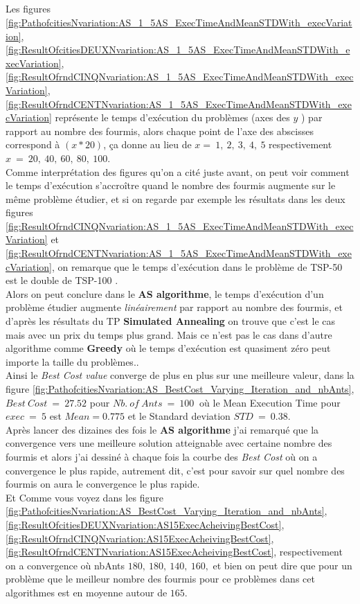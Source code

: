 \subsection*{}

Les figures 
\ref{fig:PathofcitiesNvariation:AS_1_5AS_ExecTimeAndMeanSTDWith_execVariation}, 
\ref{fig:ResultOfcitiesDEUXNvariation:AS_1_5AS_ExecTimeAndMeanSTDWith_execVariation}, 
\ref{fig:ResultOfrndCINQNvariation:AS_1_5AS_ExecTimeAndMeanSTDWith_execVariation}, 
\ref{fig:ResultOfrndCENTNvariation:AS_1_5AS_ExecTimeAndMeanSTDWith_execVariation} représente le temps d'exécution du problèmes (axes des $ y $ ) par rapport au nombre des fourmis, alors chaque point de l'axe des abscisses correspond à $ (x*20 )  $, ça donne au lieu de $ x=\ 1,\ 2,\ 3,\ 4,\ 5 $ respectivement $ x\ =\ 20,\ 40,\ 60,\ 80,\ 100 $.\\
Comme interprétation des figures qu'on a cité juste avant, on peut voir comment le temps d'exécution s'accroître quand le nombre des fourmis augmente sur le même problème étudier, et si on regarde par exemple les résultats dans les deux figures \ref{fig:ResultOfrndCINQNvariation:AS_1_5AS_ExecTimeAndMeanSTDWith_execVariation} et 
\ref{fig:ResultOfrndCENTNvariation:AS_1_5AS_ExecTimeAndMeanSTDWith_execVariation}, on remarque que le temps d'exécution dans le problème de TSP-50 est le double de TSP-100 .\\
Alors on peut conclure dans le \textbf{AS algorithme}, le temps d'exécution d'un problème étudier augmente \textit{linéairement} par rapport au nombre des fourmis, et d'après les résultats du TP \textbf{Simulated Annealing} on trouve que c'est le cas mais avec un prix du temps plus grand. Mais ce n'est pas le cas dans d'autre algorithme comme \textbf{Greedy} où le temps d'exécution est quasiment zéro peut importe la taille du problèmes..\\
Ainsi le \textit{Best Cost value} converge de plus en plus sur  une meilleure valeur, \eg dans la figure \ref{fig:PathofcitiesNvariation:AS_BestCost_Varying_Iteration_and_nbAnts}, $ Best\ Cost\ =\ 27.52 $ pour $ Nb.\ of\ Ants\ =\ 100\ $ o\`u 
le Mean Execution Time pour $ exec\ =\ 5 $  est $Mean=0.775 $ et le Standard deviation $ STD\ =\ 0.38 $.\\

Après lancer des dizaines des fois le \textbf{AS algorithme} j'ai remarqué que la convergence vers une meilleure solution atteignable avec certaine nombre des fourmis et alors j'ai dessiné à chaque fois la courbe des \textit{Best Cost} où on a convergence le plus rapide, autrement dit, c'est pour savoir sur quel nombre des fourmis on aura le convergence le plus rapide.\\
Et Comme vous voyez dans les figure 
\ref{fig:PathofcitiesNvariation:AS_BestCost_Varying_Iteration_and_nbAnts}, 
\ref{fig:ResultOfcitiesDEUXNvariation:AS15ExecAcheivingBestCost}, 
\ref{fig:ResultOfrndCINQNvariation:AS15ExecAcheivingBestCost}, 
\ref{fig:ResultOfrndCENTNvariation:AS15ExecAcheivingBestCost}, respectivement on a convergence où nbAnts $ 180,\ 180,\ 140,\ 160,  $ et bien on peut dire que pour un problème que le meilleur nombre des fourmis pour ce problèmes dans cet algorithmes est en moyenne autour de $ 165 $.

